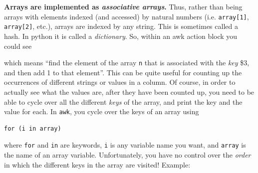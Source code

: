 \documentclass[]{krantz}
\makeatletter
\newenvironment{Shaded}{\begin{snugshade}}{\end{snugshade}}
\newcommand{\CommentTok}[1]{\textcolor[rgb]{0.37,0.37,0.37}{\textit{#1}}}
\newcommand{\ExtensionTok}[1]{#1}
\newcommand{\FunctionTok}[1]{\textcolor[rgb]{0,0,0}{#1}}
\newcommand{\NormalTok}[1]{#1}
\newcommand{\StringTok}[1]{\textcolor[rgb]{0.5,0.5,0.5}{#1}}
\newcommand{\VariableTok}[1]{\textcolor[rgb]{0,0,0}{#1}}
\newenvironment{kframe}{%
\medskip{}
\setlength{\fboxsep}{.8em}
 \def\at@end@of@kframe{}%
 \ifinner\ifhmode%
  \def\at@end@of@kframe{\end{minipage}}%
  \begin{minipage}{\columnwidth}%
 \fi\fi%
 \def\FrameCommand##1{\hskip\@totalleftmargin \hskip-\fboxsep
 \colorbox{shadecolor}{##1}\hskip-\fboxsep
     \hskip-\linewidth \hskip-\@totalleftmargin \hskip\columnwidth}%
 \MakeFramed {\advance\hsize-\width
   \@totalleftmargin\z@ \linewidth\hsize
   \@setminipage}}%
 {\par\unskip\endMakeFramed%
 \at@end@of@kframe}
\renewenvironment{Shaded}{\begin{kframe}}{\end{kframe}}
\makeatother
\begin{document}
\textbf{Arrays are implemented as \emph{associative arrays}.} Thus, rather than being arrays
with elements indexed (and accessed) by natural numbers (i.e. \texttt{array{[}1{]}}, \texttt{array{[}2{]}}, etc.),
arrays are indexed by any string. This is sometimes called a hash. In python it is
called a \emph{dictionary}. So, within an awk action block you could see

\begin{Shaded}
\end{Shaded}

which means ``find the element of the array \texttt{n} that is associated with the \emph{key} \$3, and then
add 1 to that element''. This can
be quite useful for counting up the occurrences of different strings or values
in a column. Of course, in order to actually see what the values are, after they
have been counted up, you need to be able
to cycle over all the different \emph{keys} of the array, and print the key and the
value for each. In \texttt{awk}, you cycle over the keys of an array using

\begin{verbatim}
for (i in array)
\end{verbatim}

where \texttt{for} and \texttt{in} are keywords, \texttt{i} is any variable name you want, and \texttt{array} is the
name of an array variable. Unfortunately, you have no control over the \emph{order} in which the
different keys in the array are visited! Example:

\begin{Shaded}
\end{Shaded}
\end{document}
